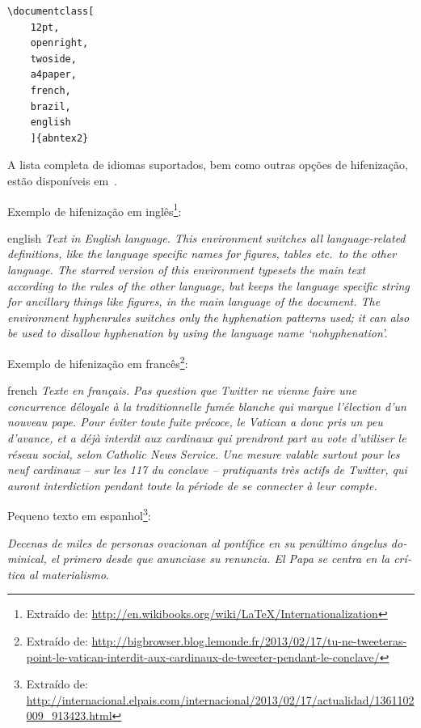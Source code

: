 \begin{verbatim}
\documentclass[
    12pt,
    openright,
    twoside,
    a4paper,
    french,
    brazil,
    english
    ]{abntex2}
\end{verbatim}

A lista completa de idiomas suportados, bem como outras opções de hifenização,
estão disponíveis em~.

Exemplo de hifenização em inglês\footnote{Extraído de:
\url{http://en.wikibooks.org/wiki/LaTeX/Internationalization}}:

\begin{otherlanguage*}{english}
\textit{Text in English language. This environment switches all language-related
  definitions, like the language specific names for figures, tables etc.\ to the other
  language. The starred version of this environment typesets the main text
  according to the rules of the other language, but keeps the language specific
  string for ancillary things like figures, in the main language of the document.
  The environment hyphenrules switches only the hyphenation patterns used; it can
  also be used to disallow hyphenation by using the language name
  `nohyphenation'.}
\end{otherlanguage*}

Exemplo de hifenização em francês\footnote{Extraído de:
\url{http://bigbrowser.blog.lemonde.fr/2013/02/17/tu-ne-tweeteras-point-le-vatican-interdit-aux-cardinaux-de-tweeter-pendant-le-conclave/}}:

\begin{otherlanguage*}{french}
\textit{Texte en français. Pas question que Twitter ne vienne faire une
  concurrence déloyale à la traditionnelle fumée blanche qui marque l'élection
  d'un nouveau pape. Pour éviter toute fuite précoce, le Vatican a donc pris un
  peu d'avance, et a déjà interdit aux cardinaux qui prendront part au vote
  d'utiliser le réseau social, selon Catholic News Service. Une mesure valable
  surtout pour les neuf cardinaux – sur les 117 du conclave – pratiquants très
  actifs de Twitter, qui auront interdiction pendant toute la période de se
  connecter à leur compte.}
\end{otherlanguage*}

Pequeno texto em espanhol\footnote{Extraído de:
\url{http://internacional.elpais.com/internacional/2013/02/17/actualidad/1361102009_913423.html}}:

\foreignlanguage{spanish}{\textit{Decenas de miles de personas ovacionan al pontífice en su
penúltimo ángelus dominical, el primero desde que anunciase su renuncia. El Papa se
centra en la crítica al materialismo}}.

